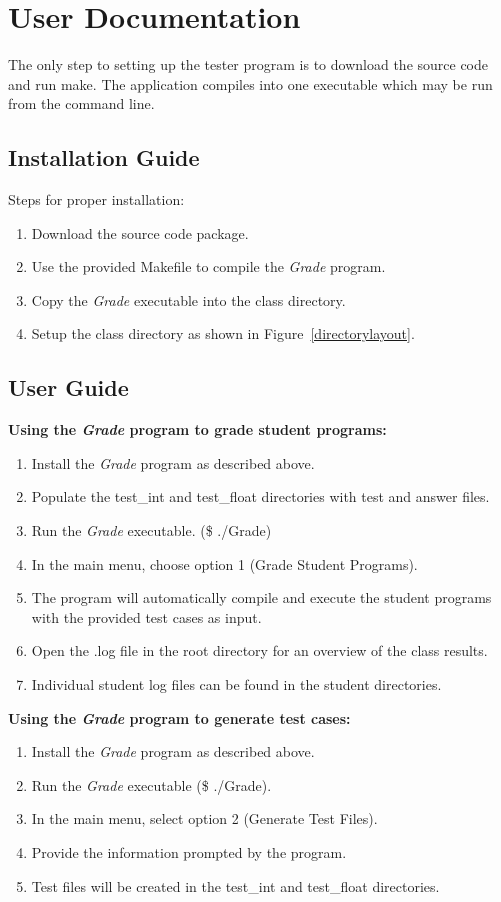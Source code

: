 
\chapter{User Documentation}

The only step to setting up the tester program is to download the source code and run 
make. The application compiles into one executable which may be run from the command line.

\section{Installation Guide}
Steps for proper installation:
\begin{enumerate}
	\item Download the source code package.
	\item Use the provided Makefile to compile the {\it Grade} program.
	\item Copy the {\it Grade} executable into the class directory.
	\item Setup the class directory as shown in Figure~\ref{directorylayout}.
\end{enumerate}

\section{User Guide}
\textbf{Using the {\it Grade} program to grade student programs:}
\begin{enumerate}
	\item Install the {\it Grade} program as described above.
	\item Populate the test\_int and test\_float directories with test and answer files.
	\item Run the {\it Grade} executable. (\$ ./Grade)
	\item In the main menu, choose option 1 (Grade Student Programs).
	\item The program will automatically compile and execute the student programs with the provided test cases as input.
	\item Open the .log file in the root directory for an overview of the class results.
	\item Individual student log files can be found in the student directories.
\end{enumerate}

\noindent \textbf {Using the {\it Grade} program to generate test cases:}
\begin{enumerate}
	\item Install the {\it Grade} program as described above.
	\item Run the {\it Grade} executable (\$ ./Grade).
	\item In the main menu, select option 2 (Generate Test Files).
	\item Provide the information prompted by the program.
	\item Test files will be created in the test\_int and test\_float directories.
\end{enumerate}

